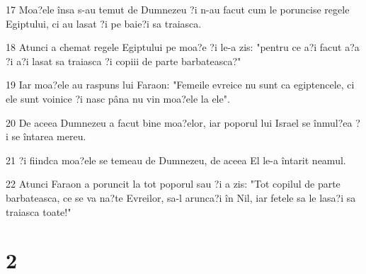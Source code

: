 \par 17 Moa?ele însa s-au temut de Dumnezeu ?i n-au facut cum le poruncise regele Egiptului, ci au lasat ?i pe baie?i sa traiasca.
\par 18 Atunci a chemat regele Egiptului pe moa?e ?i le-a zis: "pentru ce a?i facut a?a ?i a?i lasat sa traiasca ?i copiii de parte barbateasca?"
\par 19 Iar moa?ele au raspuns lui Faraon: "Femeile evreice nu sunt ca egiptencele, ci ele sunt voinice ?i nasc pâna nu vin moa?ele la ele".
\par 20 De aceea Dumnezeu a facut bine moa?elor, iar poporul lui Israel se înmul?ea ?i se întarea mereu.
\par 21 ?i fiindca moa?ele se temeau de Dumnezeu, de aceea El le-a întarit neamul.
\par 22 Atunci Faraon a poruncit la tot poporul sau ?i a zis: "Tot copilul de parte barbateasca, ce se va na?te Evreilor, sa-l arunca?i în Nil, iar fetele sa le lasa?i sa traiasca toate!"

\chapter{2}

